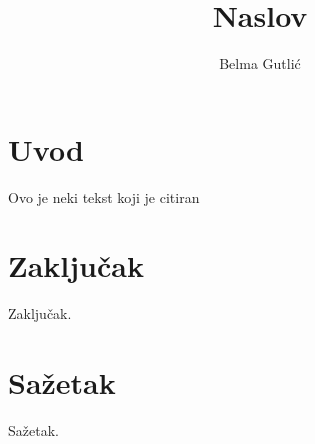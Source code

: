 \documentclass[times, utf8, seminar]{fer}
\begin{document}
\title{Naslov}

\author{Belma Gutlić}


\maketitle

\tableofcontents

\chapter{Uvod}
Ovo je neki tekst koji je citiran \citep{nesto}

\chapter{Zaključak}
Zaključak.




\chapter{Sažetak}
Sažetak.
\end{document}
